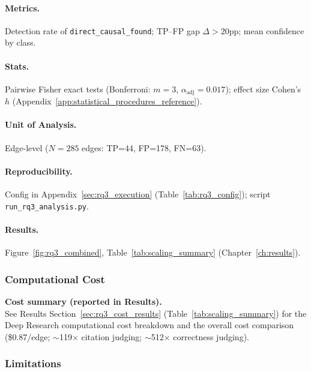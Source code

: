 \paragraph{Metrics.}
Detection rate of \texttt{direct\_causal\_found}; TP--FP gap $\Delta>20$pp; mean confidence by class.

\paragraph{Stats.}
Pairwise Fisher exact tests (Bonferroni: $m=3$, $\alpha_{\text{adj}}=0.017$); effect size Cohen's $h$ (Appendix~\ref{app:statistical_procedures_reference}).

\paragraph{Unit of Analysis.}
Edge-level ($N=285$ edges: TP=44, FP=178, FN=63).

\paragraph{Reproducibility.}
Config in Appendix~\ref{sec:rq3_execution} (Table~\ref{tab:rq3_config}); script \texttt{run\_rq3\_analysis.py}.

\paragraph{Results.}
Figure~\ref{fig:rq3_combined}, Table~\ref{tab:scaling_summary} (Chapter~\ref{ch:results}).

\subsubsection{Computational Cost}
\label{sec:rq3_computational_cost}

\noindent\textbf{Cost summary (reported in Results).}\\
See Results Section~\ref{sec:rq3_cost_results} (Table~\ref{tab:scaling_summary}) for the Deep Research computational cost breakdown and the overall cost comparison (\$0.87/edge; $\sim$119$\times$ citation judging; $\sim$512$\times$ correctness judging).

\subsubsection{Limitations}
\label{sec:rq3_limitations}

